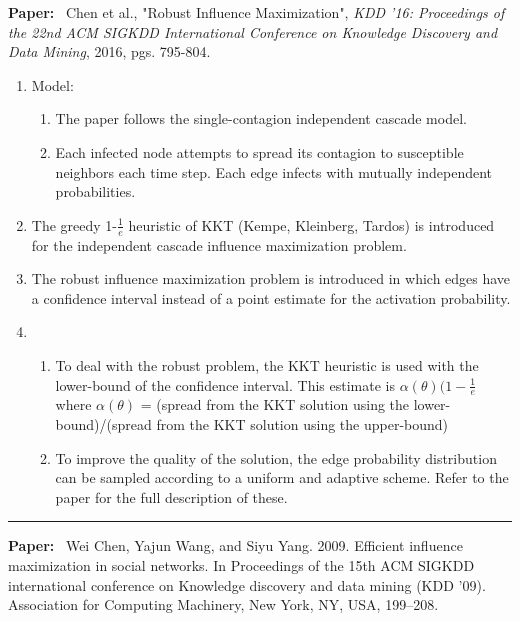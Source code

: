 \documentclass[11pt]{article}
\begin{document}
\textbf{Paper:}~
Chen et al., "Robust Influence Maximization", \emph{KDD '16: Proceedings of the 22nd ACM SIGKDD International Conference on Knowledge Discovery and Data Mining}, 2016, pgs. 795-804.
\begin{enumerate}
    \item Model: \begin{enumerate}
        \item The paper follows the single-contagion independent cascade model.
        \item Each infected node attempts to spread its contagion to susceptible neighbors each time step. Each edge infects with mutually independent probabilities.
    \end{enumerate}
    \item The greedy 1-$\frac{1}{e}$ heuristic of KKT (Kempe, Kleinberg, Tardos) is introduced for the independent cascade influence maximization problem. 
    \item The robust influence maximization problem is introduced in which edges have a confidence interval instead of a point estimate for the activation probability.
    \item \begin{enumerate}
        \item To deal with the robust problem, the KKT heuristic is used with the lower-bound of the confidence interval. This estimate is $\alpha(\theta)(1-\frac{1}{e}$ where $\alpha(\theta)$ = (spread from the KKT solution using the lower-bound)/(spread from the KKT solution using the upper-bound)
        \item To improve the quality of the solution, the edge probability distribution can be sampled according to a uniform and adaptive scheme. Refer to the paper for the full description of these.
    \end{enumerate}
    
\end{enumerate}
\noindent
\rule{\textwidth}{0.01in}
\clearpage
\textbf{Paper:}~ Wei Chen, Yajun Wang, and Siyu Yang. 2009. Efficient influence maximization in social networks. In Proceedings of the 15th ACM SIGKDD international conference on Knowledge discovery and data mining (KDD ’09). Association for Computing Machinery, New York, NY, USA, 199–208.
\end{document}
